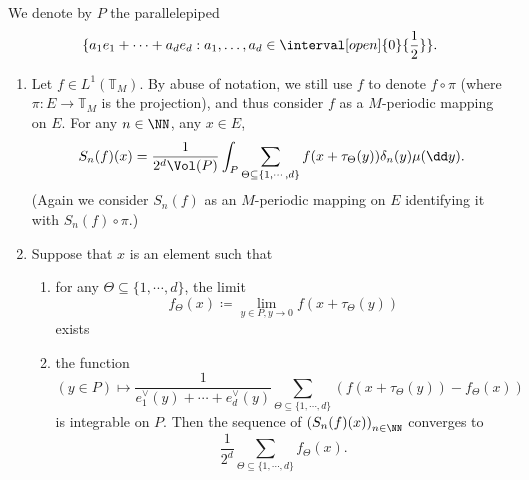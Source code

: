 \begin{theoremenv}[Dirichlet]
    We denote by $P$ the parallelepiped
    $$\{a_1e_1 + \cdots + a_d e_d : a_1,\ldots,a_d \in \interval[open]{0}{\frac{1}{2}}\}.$$
    \begin{enumerate}[label = (\arabic*)]
        \item Let $f \in L^1(\mathbb{T}_{M})$.
            By abuse of notation, we still use $f$ to denote $f \circ \pi$ (where $\pi : E \longrightarrow \mathbb{T}_{M}$ is the projection), and thus consider $f$ as a $M$-periodic mapping on $E$.
            For any $n \in \NN$, any $x \in E$,
            $$S_{n}(f) (x) = \frac{1}{2^d \Vol(P)} \int_{P} \sum_{\Theta \subseteq \{1,\cdots,d\}} f(x + \tau_{\Theta}(y)) \delta_{n}(y) \mu(\dd y).$$
            (Again we consider $S_n(f)$ as an $M$-periodic mapping on $E$ identifying it with $S_n(f) \circ \pi$.)
        \item Suppose that $x$ is an element such that
            \begin{enumerate}
                \item for any $\Theta \subseteq \{1,\cdots,d\}$, the limit
                    $$f_{\Theta}(x) \coloneq \lim_{y \in P, y \to 0} f(x + \tau_{\Theta}(y))$$
                    exists
                \item the function
                    $$(y \in P) \longmapsto \frac{1}{e_1^\vee (y) + \cdots + e_d^\vee (y)} \sum_{\Theta \subseteq \{1,\cdots,d\}} \left(f(x + \tau_{\Theta}(y)) - f_{\Theta}(x)\right)$$
                    is integrable on $P$.
                    Then the sequence of $\left(S_{n}(f)(x)\right)_{n \in \NN}$ converges to
                    $$\frac{1}{2^d} \sum_{\Theta \subseteq \{1,\cdots,d\}} f_{\Theta}(x).$$
            \end{enumerate}
    \end{enumerate}
\end{theoremenv}
